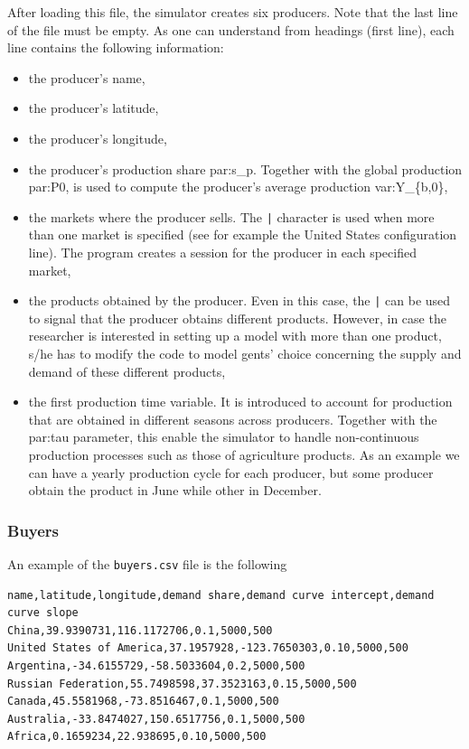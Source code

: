 \documentclass{article}
\begin{document}
After loading this file, the simulator creates six producers. Note that the last line of the file must be empty.
As one can understand from headings (first line), each line contains the following information:
\begin{itemize}
	\item the producer's name,
	\item the producer's latitude,
	\item the producer's longitude,
	\item the producer's production share \gls{par:s_p}. Together with the global production \gls{par:P0}, is used to compute the producer's average production \gls{var:Y_{b,0}},
	\item the markets where the producer sells. The \verb+|+ character is used when more than one market is specified (see for example the United States configuration line). The program creates a session for the producer in each specified market,
	\item the products obtained by the producer. Even in this case, the \verb+|+ can be used to signal that the producer obtains different products. However, in case the researcher is interested in setting up a model with more than one product, s/he has to modify the code to model gents' choice concerning the supply and demand of these different products,
	\item the first production time variable. It is introduced to account for production that are obtained in different seasons across producers. Together with the \gls{par:tau} parameter, this enable the simulator to handle non-continuous production processes such as those of agriculture products. As an example we can have a yearly production cycle for each producer, but some producer obtain the product in June while other in December.
\end{itemize}

\subsubsection{Buyers}
An example of the \verb+buyers.csv+ file is the following 

\begin{verbatim}
name,latitude,longitude,demand share,demand curve intercept,demand curve slope
China,39.9390731,116.1172706,0.1,5000,500
United States of America,37.1957928,-123.7650303,0.10,5000,500
Argentina,-34.6155729,-58.5033604,0.2,5000,500
Russian Federation,55.7498598,37.3523163,0.15,5000,500
Canada,45.5581968,-73.8516467,0.1,5000,500
Australia,-33.8474027,150.6517756,0.1,5000,500
Africa,0.1659234,22.938695,0.10,5000,500

\end{verbatim}
\end{document}
